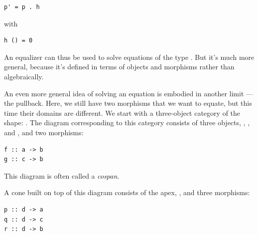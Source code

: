 \begin{Verbatim}[commandchars=\\\{\}]
p' = p . h
\end{Verbatim}
with

\begin{Verbatim}[commandchars=\\\{\}]
h () = 0
\end{Verbatim}

\begin{figure}[H]
\centering
{}
\end{figure}

\noindent
An equalizer can thus be used to solve equations of the type
. But it's much more general, because it's defined
in terms of objects and morphisms rather than algebraically.

An even more general idea of solving an equation is embodied in another
limit --- the pullback. Here, we still have two morphisms that we want
to equate, but this time their domains are different. We start with a
three-object category of the shape:
. The diagram corresponding to
this category consists of three objects, , , and
, and two morphisms:

\begin{Verbatim}[commandchars=\\\{\}]
f :: a -> b
g :: c -> b
\end{Verbatim}
This diagram is often called a \emph{cospan}.

A cone built on top of this diagram consists of the apex, ,
and three morphisms:

\begin{Verbatim}[commandchars=\\\{\}]
p :: d -> a
q :: d -> c
r :: d -> b
\end{Verbatim}

\begin{figure}[H]
\centering
{}
\end{figure}


